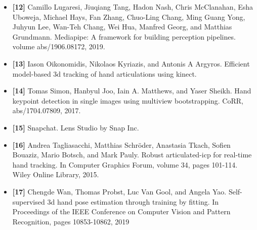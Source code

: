 \documentclass[12pt, a4paper]{article}
\begin{document}
\begin{itemize}[label=]
    \item \textbf{[12]} Camillo Lugaresi, Jiuqiang Tang, Hadon Nash, Chris McClanahan, Esha Uboweja, Michael Hays, Fan Zhang, Chuo-Ling Chang, Ming Guang Yong, Juhyun Lee, Wan-Teh Chang, Wei Hua, Manfred Georg, and Matthias Grundmann. Mediapipe: A framework for building perception pipelines. volume abs/1906.08172, 2019.
    \item \textbf{[13]} Iason Oikonomidis, Nikolaos Kyriazis, and Antonis A Argyros. Efficient model-based 3d tracking of hand articulations using kinect.
    \item \textbf{[14]} Tomas Simon, Hanbyul Joo, Iain A. Matthews, and Yaser Sheikh. Hand keypoint detection in single images using multiview bootstrapping. CoRR, abs/1704.07809, 2017.
    \item \textbf{[15]} Snapchat. Lens Studio by Snap Inc.
    \item \textbf{[16]} Andrea Tagliasacchi, Matthias Schröder, Anastasia Tkach, Sofien Bouaziz, Mario Botsch, and Mark Pauly. Robust articulated-icp for real-time hand tracking. In Computer Graphics Forum, volume 34, pages 101-114. Wiley Online Library, 2015.
    \item \textbf{[17]} Chengde Wan, Thomas Probst, Luc Van Gool, and Angela Yao. Self-supervised 3d hand pose estimation through training by fitting. In Proceedings of the IEEE Conference on Computer Vision and Pattern Recognition, pages 10853-10862, 2019
\end{itemize}
\end{document}
